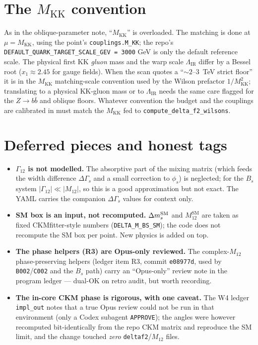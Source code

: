 \documentclass[11pt]{article}
\newcommand{\MKK}{M_{\mathrm{KK}}}
\newcommand{\LIR}{\Lambda_{\mathrm{IR}}}
\newcommand{\code}[1]{\texttt{#1}}
\newcommand{\Bs}{B_s}
\newcommand{\dms}{\Delta m_s}
\newcommand{\phis}{\phi_s}
\newcommand{\Mtwelve}{M_{12}}
\newcommand{\MtwelveSM}{M_{12}^{\mathrm{SM}}}
\theoremstyle{definition}
\begin{document}
\section{The $\MKK$ convention}
\label{sec:Mconvention}

As in the oblique-parameter note, ``$\MKK$'' is overloaded. The matching is done
at $\mu=\MKK$, using the point's \code{couplings.M\_KK}; the repo's
\code{DEFAULT\_QUARK\_TARGET\_SCALE\_GEV = 3000} GeV is only the default reference
scale. The
physical first KK \emph{gluon} mass and the warp scale $\LIR$ differ by a Bessel
root ($x_1\approx 2.45$ for gauge fields). When the scan quotes a ``$\sim 2$--$3$~TeV
strict floor'' it is in the $\MKK$ matching-scale convention used by the Wilson
prefactor $1/\MKK^2$; translating to a physical KK-gluon mass or to $\LIR$ needs
the same care flagged for the $Z\to b\bar b$ and oblique floors. Whatever
convention the budget and the couplings are calibrated in must match the $\MKK$
fed to \code{compute\_delta\_f2\_wilsons}.

\section{Deferred pieces and honest tags}
\label{sec:deferred}

\begin{itemize}[leftmargin=1.4em]
\item \textbf{$\Gamma_{12}$ is not modelled.} The absorptive part of the mixing
matrix (which feeds the width difference $\Delta\Gamma_s$ and a small correction
to $\phis$) is neglected; for the $\Bs$ system $|\Gamma_{12}|\ll|\Mtwelve|$, so
this is a good approximation but not exact. The YAML carries the companion
$\Delta\Gamma_s$ values for context only.
\item \textbf{SM box is an input, not recomputed.} $\dms^{\rm SM}$ and
$\MtwelveSM$ are taken as fixed CKMfitter-style numbers
(\code{DELTA\_M\_BS\_SM}); the code does not recompute the SM box per point. New
physics is added on top.
\item \textbf{The phase helpers (R3) are Opus-only reviewed.} The complex-$M_{12}$
phase-preserving helpers (ledger item R3, commit \code{e08977d}, used by
\code{B002}/\code{C002} and the $\Bs$ path) carry an ``Opus-only'' review note in
the program ledger --- dual-OK on retro audit, but worth recording.
\item \textbf{The in-core CKM phase is rigorous, with one caveat.} The W4 ledger
\code{impl\_out} notes that a true Opus review could not be run in that
environment (only a Codex subagent \code{APPROVE}); the angles were however
recomputed bit-identically from the repo CKM matrix and reproduce the SM limit,
and the change touched \emph{zero} \code{deltaf2}/$M_{12}$ files.
\end{itemize}
\end{document}

